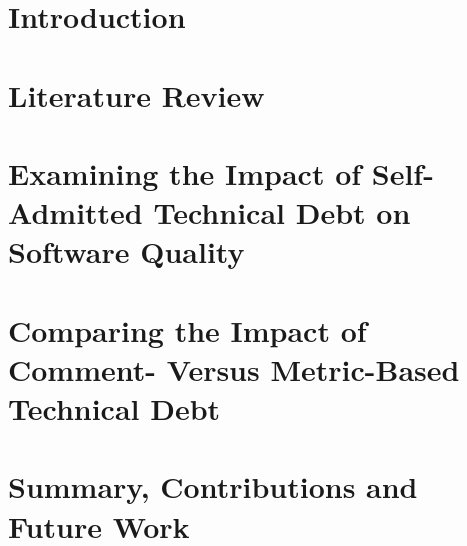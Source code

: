 \documentclass[12pt]{report}
\begin{document}
\chapter{Introduction}
\label{introduction}


\chapter{Literature Review}
\label{literature_review}


\chapter{Examining the Impact of Self-Admitted Technical Debt on Software Quality}
\label{chapter3}


\chapter{Comparing the Impact of Comment- Versus Metric-Based Technical Debt}
\label{chapter4}


\chapter{Summary, Contributions and Future Work}
\label{conclusion}



\begin{appendices}
	\label{appendix}
	
\end{appendices}

  

\end{document}
